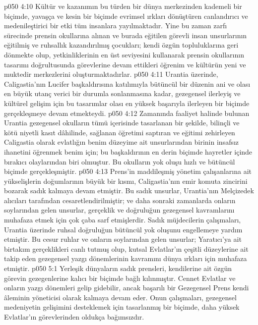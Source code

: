 \vs p050 4:10 Kültür ve kazanımın bu türden bir dünya merkezinden kademeli bir biçimde, yavaşça ve kesin bir biçimde evrimsel ırkları dönüştüren canlandırıcı ve medenileştirici bir etki tüm insanlara yayılmaktadır. Yine bu zaman zarfı sürecinde prensin okullarına alınan ve burada eğitilen görevli insan unsurlarının eğitilmiş ve ruhsallık kazandırılmış çocukları; kendi özgün topluluklarına geri dönmekte olup, yetkinliklerinin en üst seviyesini kullanarak prensin okullarının tasarımı doğrultusunda görevlerine devam ettikleri öğrenim ve kültürün yeni ve muktedir merkezlerini oluşturmaktadırlar.
\vs p050 4:11 Urantia üzerinde, Caligastia’nın Lucifer başkaldırısına katılımıyla bütüncül bir düzenin ani ve olası en büyük utanç verici bir durumla sonlanmasına kadar, gezegensel ilerleyiş ve kültürel gelişim için bu tasarımlar olası en yüksek başarıyla ilerleyen bir biçimde gerçekleşmeye devam etmekteydi.
\vs p050 4:12 Zamanında faaliyet halinde bulunan Urantia gezegensel okulların tümü içerisinde tasarlanan bir şekilde, bilinçli ve kötü niyetli kasıt dâhilinde, sağlanan öğretimi saptıran ve eğitimi zehirleyen Caligastia olarak evlatlığın benim düzeyime ait unsurlarından birinin insafsız ihanetini öğrenmek benim için; bu başkaldırının en derin biçimde hayretler içinde bırakıcı olaylarından biri olmuştur. Bu okulların yok oluşu hızlı ve bütüncül biçimde gerçekleşmiştir.
\vs p050 4:13 Prens’in maddileşmiş yönetim çalışanlarına ait yükselişlerin doğumlarının büyük bir kısmı, Caligastia’nın emir komuta zincirini bozarak sadık kalmaya devam etmiştir. Bu sadık unsurlar, Urantia’nın Melçizedek alıcıları tarafından cesaretlendirilmiştir; ve daha sonraki zamanlarda onların soylarından gelen unsurlar, gerçeklik ve doğruluğun gezegensel kavramlarını muhafaza etmek için çok çaba sarf etmişlerdir. Sadık müjdecilerin çalışmaları, Urantia üzerinde ruhsal doğruluğun bütüncül yok oluşunu engellemeye yardım etmiştir. Bu cesur ruhlar ve onların soylarından gelen unsurlar; Yaratıcı’ya ait birtakım gerçeklikleri canlı tutmuş olup, kutsal Evlatlar’ın çeşitli düzeylerine ait takip eden gezegensel yazgı dönemlerinin kavramını dünya ırkları için muhafaza etmiştir.
\vs p050 5:1 Yerleşik dünyaların sadık prensleri, kendilerine ait özgün görevin gezegenlerine kalıcı bir biçimde bağlı kılınmıştır. Cennet Evlatlar ve onların yazgı dönemleri gelip gidebilir, ancak başarılı bir Gezegensel Prens kendi âleminin yöneticisi olarak kalmaya devam eder. Onun çalışmaları, gezegensel medeniyetin gelişimini desteklemek için tasarlanmış bir biçimde, daha yüksek Evlatlar’ın görevlerinden oldukça bağımsızdır.
